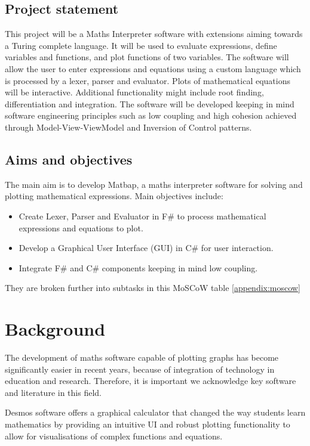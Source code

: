 \documentclass[a4paper, oneside, 11pt]{report}
\begin{document}
\section{Project statement}
This project will be a Maths Interpreter software with extensions aiming
towards a Turing complete language. It will be used to evaluate expressions, define
variables and functions, and plot functions of two variables. The software
will allow the user to enter expressions and equations using a custom language which is processed by a lexer, parser and evaluator. Plots of mathematical equations will be interactive. Additional functionality might include root finding, differentiation and integration. The software will be developed keeping in mind software engineering principles such as low coupling and high cohesion achieved through Model-View-ViewModel and Inversion of Control patterns. 

\section{Aims and objectives}
The main aim is to develop Matbap, a maths interpreter software for solving and plotting mathematical expressions. Main objectives include:
\begin{itemize}
    \item Create Lexer, Parser and Evaluator in F\# to process mathematical expressions and equations to plot.
    \item Develop a Graphical User Interface (GUI) in C\# for user interaction.
    \item Integrate F\# and C\# components keeping in mind low coupling.
\end{itemize}

\noindent %
They are broken further into subtasks in this MoSCoW table \ref{appendix:moscow} 


\chapter{Background}
The development of maths software capable of plotting graphs has become significantly easier in recent years, because of integration of technology in education and research. Therefore, it is important we acknowledge key software and literature in this field.

Desmos\cite{Desmos:2023} software offers a graphical calculator that changed the way students learn mathematics by providing an intuitive UI and robust plotting functionality to allow for visualisations of complex functions and equations.
\end{document}
